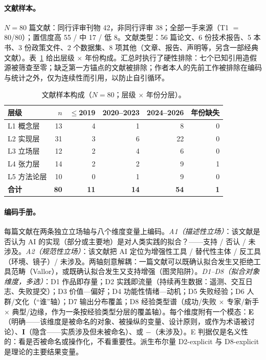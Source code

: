 \documentclass[10pt,fontset=fandol]{ctexart}
\newcommand{\dminus}{-}
\begin{document}
\paragraph{文献样本。}
$N = 80$ 篇文献：同行评审刊物 42，非同行评审 38；全部一手来源（T1 $=$ 80/80）；置信度高 55 / 中 17 / 低 8。文献类型：56 篇论文、6 份技术报告、5 本书、3 份政策文件、2 个数据集、8 项其他（文章、报告、声明等，另含一部经典文献）。表~\ref{tab:composition} 给出层级 $\times$ 年份构成。汇总时执行了硬性排除：七个已知引用造假源被筛查至零；缺乏第一方锚点的文献被排除；作者本人的先前工作被排除在编码与统计之外，仅为连续性而引用，以防止自引循环。

\begin{table}[t]
\centering
\caption{文献样本构成（$N = 80$；层级 $\times$ 年份分层）。}
\label{tab:composition}
\begin{tabular}{lrrrrr}
\toprule
层级 & $n$ & $\leq$2019 & 2020--2023 & 2024--2026 & 年份缺失 \\
\midrule
L1 概念层          & 13 & 4 & 1 & 8  & 0 \\
L2 实现层          & 31 & 3 & 6 & 22 & 0 \\
L3 立场层          & 12 & 2 & 4 & 6  & 0 \\
L4 张力层          & 14 & 2 & 2 & 9  & 1 \\
L5 方法论层        & 10 & 0 & 1 & 9  & 0 \\
\midrule
\textbf{合计}      & \textbf{80} & \textbf{11} & \textbf{14} & \textbf{54} & \textbf{1} \\
\bottomrule
\end{tabular}
\end{table}

\paragraph{编码手册。}
每篇文献在两条独立立场轴与八个维度变量上编码。\emph{A1（描述性立场）}：该文献是否认为 AI 的实现（部分或主要地）是对人类实践的拟合？——支持 / 否认 / 未涉及。\emph{A2（规范性立场）}：该文献把 AI 定位为增强性工具 / 替代性主体 / 反工具（环境、镜子）/ 未涉及。两轴刻意解耦：一篇文献可以既确认拟合发生又拒绝工具范畴（Vallor），或既确认拟合发生又支持增强（图灵陷阱）。\emph{D1--D8（拟合对象维度，多选）}：D1 作品即存量；D2 实践即流量（持续再生数据：遥测、交互日志、失败提交）；D3 价值—偏好；D4 功能性情绪—动机；D5 失败经验；D6 人群/文化（“谁”轴）；D7 输出分布覆盖；D8 经验类型谱（成功/失败 $\times$ 专家/新手 $\times$ 典型/边缘，作为一条按经验类型分层的覆盖轴）。每个维度附有一个模态：\textbf{E}（明确——该维度是被命名的对象、被操纵的变量、设计原则，或作为术语被讨论）、\textbf{I}（隐含——实质涉及但未被命名）、或 $\dminus$（未涉及）。E 判据仅是名义性的：看是否被命名或操作化，不看重要性。派生布尔量 D2-explicit 与 D8-explicit 是理论的主要结果变量。
\end{document}
